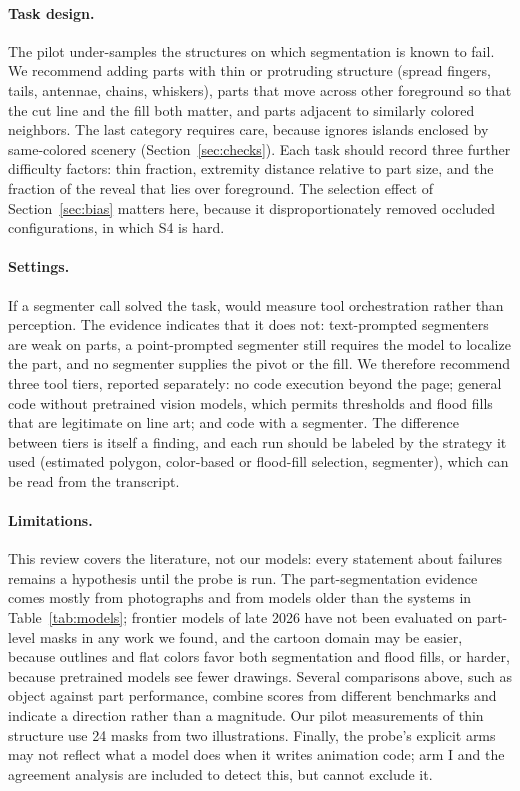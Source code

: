 \paragraph{Task design.} The pilot under-samples the structures on which segmentation is known to fail. We recommend adding parts with thin or protruding structure (spread fingers, tails, antennae, chains, whiskers), parts that move across other foreground so that the cut line and the fill both matter, and parts adjacent to similarly colored neighbors. The last category requires care, because  ignores islands enclosed by same-colored scenery (Section~\ref{sec:checks}). Each task should record three further difficulty factors: thin fraction, extremity distance relative to part size, and the fraction of the reveal that lies over foreground. The selection effect of Section~\ref{sec:bias} matters here, because it disproportionately removed occluded configurations, in which S4 is hard.

\paragraph{Settings.} If a segmenter call solved the task, \anibench{} would measure tool orchestration rather than perception. The evidence indicates that it does not: text-prompted segmenters are weak on parts, a point-prompted segmenter still requires the model to localize the part, and no segmenter supplies the pivot or the fill. We therefore recommend three tool tiers, reported separately: no code execution beyond the page; general code without pretrained vision models, which permits thresholds and flood fills that are legitimate on line art; and code with a segmenter. The difference between tiers is itself a finding, and each run should be labeled by the strategy it used (estimated polygon, color-based or flood-fill selection, segmenter), which can be read from the transcript.

\paragraph{Limitations.} This review covers the literature, not our models: every statement about \anibench{} failures remains a hypothesis until the probe is run. The part-segmentation evidence comes mostly from photographs and from models older than the systems in Table~\ref{tab:models}; frontier models of late 2026 have not been evaluated on part-level masks in any work we found, and the cartoon domain may be easier, because outlines and flat colors favor both segmentation and flood fills, or harder, because pretrained models see fewer drawings. Several comparisons above, such as object against part performance, combine scores from different benchmarks and indicate a direction rather than a magnitude. Our pilot measurements of thin structure use 24 masks from two illustrations. Finally, the probe's explicit arms may not reflect what a model does when it writes animation code; arm I and the agreement analysis are included to detect this, but cannot exclude it.
